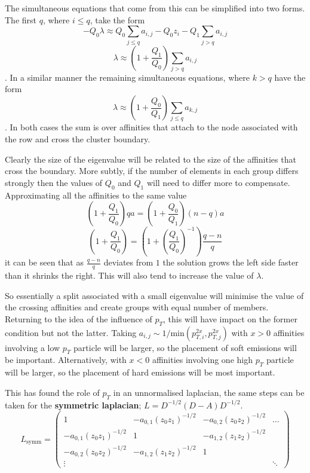 The simultaneous equations that come from this can be simplified into two forms.
The first \(q\), where \(i \leq q\), take the form
\begin{equation}-Q_0 \lambda \approx Q_0 \sum_{j \leq q} a_{i,j} - Q_0 z_i - Q_1\sum_{j>q} a_{i,j}\end{equation}
\begin{equation}\lambda \approx \left(1 + \frac{Q_1}{Q_0}\right)\sum_{j>q} a_{i,j}\end{equation}.
In a similar manner the remaining simultaneous equations, where \(k > q\) have the form
\begin{equation}\lambda \approx \left(1 + \frac{Q_0}{Q_1}\right)\sum_{j\leq q} a_{k,j}\end{equation}.
In both cases the sum is over affinities that attach to the node associated with the row
and cross the cluster boundary.

Clearly the size of the eigenvalue will be related to the size of the affinities that cross the boundary.
More subtly, if the number of elements in each group differs strongly then the values of \(Q_0\) and \(Q_1\)
will need to differ more to compensate.
Approximating all the affinities to the same value
\begin{equation}\left(1 + \frac{Q_1}{Q_0}\right)qa = \left(1 + \frac{Q_0}{Q_1}\right)(n-q)a\end{equation}
\begin{equation}\left(1 + \frac{Q_1}{Q_0}\right) = \left(1 + \left(\frac{Q_1}{Q_0}\right)^{-1}\right)\frac{q-n}{q}\end{equation}
it can be seen that as \(\frac{q-n}{q}\) deviates from \(1\) the solution grows the left side faster than it shrinks the right.
This will also tend to increase the value of \(\lambda\).

So essentially a split associated with a small eigenvalue will minimise the value of the crossing affinities
and create groups with equal number of members.
Returning to the idea of the influence of \(p_T\), this will have impact on the former condition but not the latter.
Taking \(a_{i,j} \sim 1/\text{min}(p_{T,i}^{2x}, p_{T,j}^{2x})\) with \(x>0\) affinities involving a low \(p_T\)
particle will be larger, so the placement of soft emissions will be important.
Alternatively, with \(x < 0\) affinities involving one high \(p_T\) particle will be larger,
so the placement of hard emissions will be most important.

This has found the role of \(p_T\) in an unnormalised laplacian,
the same steps can be taken for the \textbf{symmetric laplacian}; \(L = D^{-1/2}(D -A) D^{-1/2}\).
\begin{equation}
    L_\text{symm} = 
    \begin{pmatrix}
        1 & -a_{0,1}(z_0z_1)^{-1/2} & -a_{0,2}(z_0z_2)^{-1/2} & \hdots \\
        -a_{0,1}(z_0z_1)^{-1/2} & 1 & -a_{1,2}(z_1z_2)^{-1/2} & \\
        -a_{0,2}(z_0z_2)^{-1/2} & -a_{1,2}(z_1z_2)^{-1/2} & 1 & \\
        \vdots   &          &     & \ddots 
    \end{pmatrix}
\end{equation}

